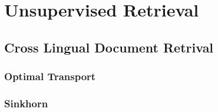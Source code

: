 
\chapter{Unsupervised Retrieval}%
\label{chap:unsupervised_retrieval}

\section{Cross Lingual Document Retrival}%
\label{sec:cross_lingual_document_retrival}

\subsection{Optimal Transport}%
\label{sub:optimal_transport}

\subsection{Sinkhorn}%
\label{sub:sinkhorn}






